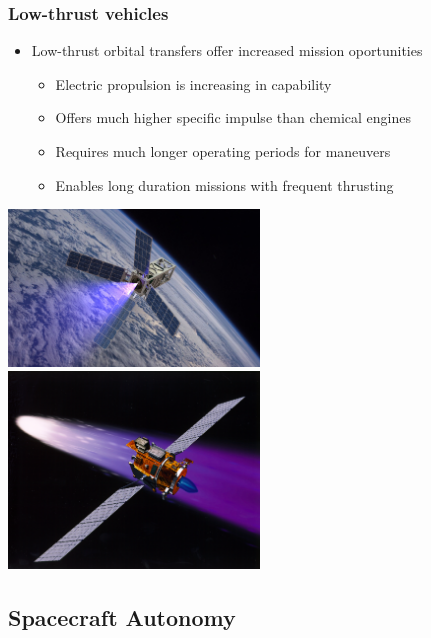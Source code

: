 \begin{frame} \label{slide:lowthrust_vehicles}%
\frametitle{Low-thrust vehicles} %
\begin{itemize}
    \item Low-thrust orbital transfers offer increased mission oportunities
    \begin{itemize}
        \item Electric propulsion is increasing in capability
        \item Offers much higher specific impulse than chemical engines 
        \item Requires much longer operating periods for maneuvers 
        \item Enables long duration missions with frequent thrusting
    \end{itemize}
\end{itemize}

\begin{center}
    \includegraphics[height=0.4\textheight,width=0.5\textwidth,keepaspectratio]{figures/2016AAS/patriot_plume.jpg}
    ~
    \includegraphics[height=0.4\textheight,width=0.5\textwidth,keepaspectratio]{figures/2016AAS/deepspace1.jpg}
\end{center}
\hyperlink{slide:propulsion}{}
\end{frame}   %

\subsection[Spacecraft Autonomy]{Spacecraft Autonomy}

